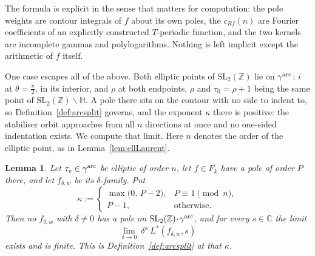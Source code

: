 \documentclass[11pt]{article}
\newtheorem{lemma}[theorem]{Lemma}
\newcommand{\HH}{\mathbb{H}}
\newcommand{\ZZ}{\mathbb{Z}}
\newcommand{\CC}{\mathbb{C}}
\newcommand{\SLZ}{\mathrm{SL}_2(\ZZ)}
\begin{document}
The formula is explicit in the sense that matters for computation: the pole weights are contour
integrals of $f$ about its own poles, the $c_{Rf}(n)$ are Fourier coefficients of an explicitly
constructed $T$-periodic function, and the two kernels are incomplete gammas and polylogarithms.
Nothing is left implicit except the arithmetic of $f$ itself.

\iffalse
One case escapes all of the above. Both elliptic points of $\SLZ$ lie on $\gamma^{\rm arc}$: $i$ at
$\theta=\tfrac{\pi}{2}$, in its interior, and $\rho$ at both endpoints, $\rho$ and $\tau_0=\rho+1$
being the same point of $\SLZ\backslash\HH$. A pole there sits on the contour with no side to
indent to, so Definition~\ref{def:arcsplit} governs, and the exponent $\kappa$
there is positive: the stabiliser orbit approaches from all $n$ directions at once and no
one-sided indentation exists. We compute that limit. Here $n$ denotes the order of the elliptic
point, as in Lemma~\ref{lem:ellLaurent}.

\begin{lemma}\label{lem:ellLstar}
Let $\tau_e\in\gamma^{\rm arc}$ be elliptic of order $n$, let $f\in F_k$ have a pole of order $P$
there, and let $f_{\delta,w}$ be its $\delta$-family. Put
\begin{equation}\label{eq:ellkappa}
\kappa:=\begin{cases}
\max\big(0,\,P-2\big), & P\equiv1\!\!\pmod n,\\[1mm]
P-1, & \text{otherwise.}
\end{cases}
\end{equation}
Then no $f_{\delta,w}$ with $\delta\ne0$ has a pole on $\SLZ\!\cdot\!\gamma^{\rm arc}$, and for
every $s\in\CC$ the limit
\begin{equation}\label{eq:ellLstar}
\lim_{\delta\to0}\ \delta^{\kappa}\,L^*(f_{\delta,w},s)
\end{equation}
exists and is finite.
This is Definition~\ref{def:arcsplit} at that $\kappa$.
\end{lemma}
\end{document}
